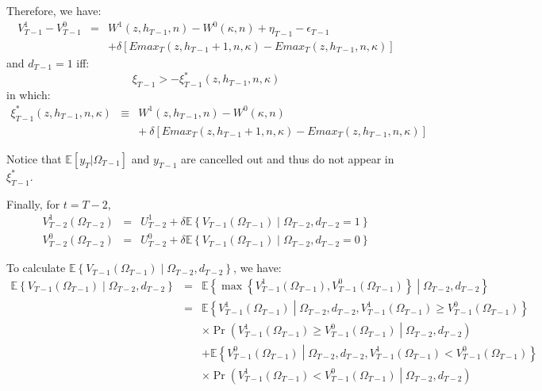 \noindent Therefore, we have:
\begin{eqnarray*}
V^1_{T-1} - V^0_{T-1} &=& W^1\left( z, h_{T-1}, n\right) - W^0\left( \kappa, n\right) + \eta_{T-1} - \epsilon_{T-1}\\
& & + \delta [ Emax_T\left(z, h_{T-1}+1, n, \kappa\right) - Emax_T\left(z, h_{T-1}, n, \kappa \right)]
\end{eqnarray*}
\noindent and $d_{T-1} = 1$ iff:
\begin{equation*}
\xi_{T-1} > -\xi^*_{T-1}\left(z, h_{T-1}, n, \kappa\right)
\end{equation*}
in which:
\begin{eqnarray*}
\xi^*_{T-1}\left(z, h_{T-1}, n, \kappa \right) &\equiv & W^1\left(z, h_{T-1}, n\right) - W^0\left(\kappa, n\right)\\
& &+\ \delta [ Emax_T\left(z, h_{T-1}+1, n, \kappa\right) - Emax_T\left(z, h_{T-1}, n, \kappa \right)] 
\end{eqnarray*}

\noindent Notice that $\mathbb{E} [y_T | \Omega_{T-1}]$ and $y_{T-1}$ are cancelled out and thus do not appear in $\xi_{T-1}^*$.

\noindent Finally, for $t = T-2$,
\begin{eqnarray*}
V^{1}_{T-2}\left(\Omega_{T-2}\right) &=& U^{1}_{T-2} + 
\delta \mathbb{E} \left\{ V_{T-1}\left(\Omega_{T-1}\right) \middle| \Omega_{T-2}, d_{T-2}=1\right\} \\
V^{0}_{T-2}\left(\Omega_{T-2}\right) &=& U^{0}_{T-2} + 
\delta \mathbb{E} \left\{ V_{T-1}\left(\Omega_{T-1}\right) \middle| \Omega_{T-2}, d_{T-2}=0\right\}
\end{eqnarray*}

\noindent To calculate $\mathbb{E} \left\{ V_{T-1}\left(\Omega_{T-1}\right) \middle| \Omega_{T-2}, d_{T-2}\right\}$, we have:
\begin{eqnarray*}
\mathbb{E} \left\{ V_{T-1}\left(\Omega_{T-1}\right) \middle| \Omega_{T-2}, d_{T-2}\right\} &=& \mathbb{E} \left\{ \max\left\{ V^{1}_{T-1}\left(\Omega_{T-1}\right), V^{0}_{T-1}\left(\Omega_{T-1}\right) \right\} \middle| \Omega_{T-2}, d_{T-2} \right\} \\
&=& \mathbb{E} \left\{ V^{1}_{T-1}\left(\Omega_{T-1}\right) \middle| \Omega_{T-2}, d_{T-2}, V^{1}_{T-1}\left(\Omega_{T-1}\right) \geq V^{0}_{T-1}\left(\Omega_{T-1}\right) \right\} \\
& & \times \Pr\left(V^1_{T-1}\left(\Omega_{T-1}\right) \geq V^0_{T-1}\left(\Omega_{T-1}\right) \middle| \Omega_{T-2}, d_{T-2} \right)\\
& & + \mathbb{E} \left\{ V^{0}_{T-1}\left(\Omega_{T-1}\right) \middle| \Omega_{T-2}, d_{T-2}, V^{1}_{T-1}\left(\Omega_{T-1}\right) < V^{0}_{T-1}\left(\Omega_{T-1}\right) \right\} \\
& & \times \Pr\left(V^1_{T-1}\left(\Omega_{T-1}\right) < V^0_{T-1}\left(\Omega_{T-1}\right) \middle| \Omega_{T-2}, d_{T-2} \right)
\end{eqnarray*}

